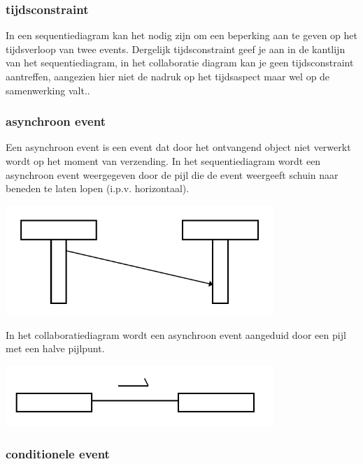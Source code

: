 \subsubsection{tijdsconstraint}

In een sequentiediagram kan het nodig zijn om een beperking aan te geven op het tijdsverloop van twee events.
Dergelijk tijdsconstraint geef je aan in de kantlijn van het sequentiediagram, in het collaboratie diagram kan je geen tijdsconstraint aantreffen, aangezien hier niet de nadruk op het tijdsaspect maar wel op de samenwerking valt..

\subsubsection{asynchroon event}

Een asynchroon event is een event dat door het ontvangend object niet verwerkt wordt op het moment van verzending.
In het sequentiediagram wordt een asynchroon event weergegeven door de pijl die de event weergeeft schuin naar beneden te laten lopen (i.p.v. horizontaal).


\begin{center}
\includegraphics[width=4in]{img/async1}%
\end{center}

In het collaboratiediagram wordt een asynchroon event aangeduid door een pijl met een halve pijlpunt.


\begin{center}
\includegraphics[width=4in]{img/async2}%
\end{center}
\newpage
\subsubsection{conditionele event}

